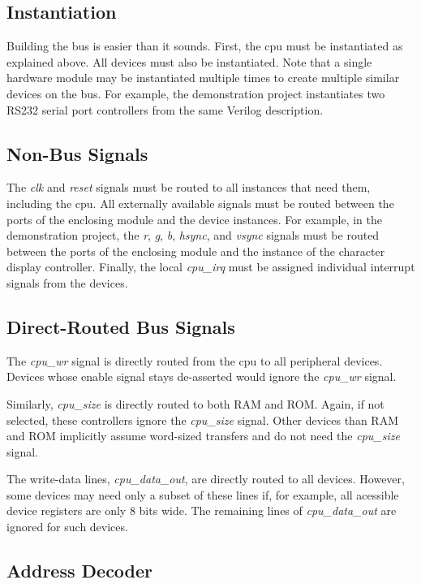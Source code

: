 \subsection{Instantiation}

Building the bus is easier than it sounds. First, the cpu must be instantiated as explained above. All devices must also be instantiated. Note that a single hardware module may be instantiated multiple times to create multiple similar devices on the bus. For example, the demonstration project instantiates two RS232 serial port controllers from the same Verilog description.

\subsection{Non-Bus Signals}

The {\it clk} and {\it reset} signals must be routed to all instances that need them, including the cpu. All externally available signals must be routed between the ports of the enclosing module and the device instances. For example, in the demonstration project, the {\it r}, {\it g}, {\it b}, {\it hsync}, and {\it vsync} signals must be routed between the ports of the enclosing module and the instance of the character display controller. Finally, the local {\it cpu\_irq} must be assigned individual interrupt signals from the devices.

\subsection{Direct-Routed Bus Signals}

The {\it cpu\_wr} signal is directly routed from the cpu to all peripheral devices. Devices whose enable signal stays de-asserted would ignore the {\it cpu\_wr} signal.

Similarly, {\it cpu\_size} is directly routed to both RAM and ROM. Again, if not selected, these controllers ignore the {\it cpu\_size} signal. Other devices than RAM and ROM implicitly assume word-sized transfers and do not need the {\it cpu\_size} signal.

The write-data lines, {\it cpu\_data\_out}, are directly routed to all devices. However, some devices may need only a subset of these lines if, for example, all acessible device registers are only 8 bits wide. The remaining lines of {\it cpu\_data\_out} are ignored for such devices.

\subsection{Address Decoder}

